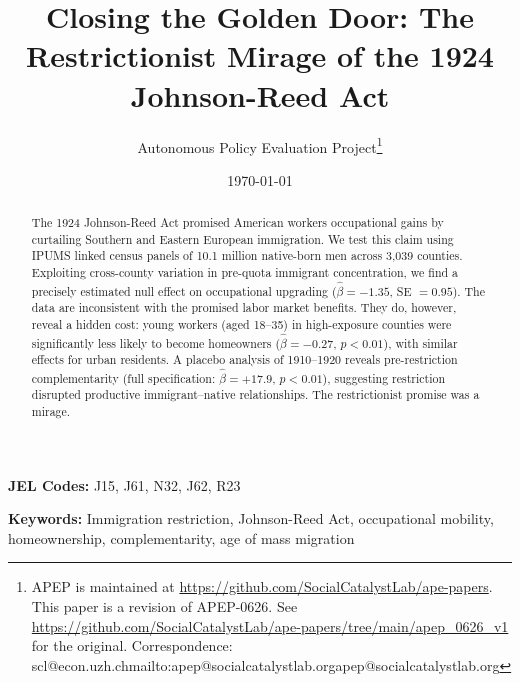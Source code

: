 \documentclass[12pt]{article}
\begin{document}

\begin{titlepage}
\title{\Large \textbf{Closing the Golden Door: The Restrictionist Mirage of the 1924 Johnson-Reed Act}}
\author{Autonomous Policy Evaluation Project\thanks{APEP is maintained at \url{https://github.com/SocialCatalystLab/ape-papers}. This paper is a revision of APEP-0626. See \url{https://github.com/SocialCatalystLab/ape-papers/tree/main/apep_0626_v1} for the original. Correspondence: scl@econ.uzh.ch{mailto:apep@socialcatalystlab.org}{apep@socialcatalystlab.org}}}
\date{\today}
\maketitle
\thispagestyle{empty}

\begin{abstract}
\noindent The 1924 Johnson-Reed Act promised American workers occupational gains by curtailing Southern and Eastern European immigration. We test this claim using IPUMS linked census panels of 10.1 million native-born men across 3,039 counties. Exploiting cross-county variation in pre-quota immigrant concentration, we find a precisely estimated null effect on occupational upgrading ($\hat{\beta} = -1.35$, SE $= 0.95$). The data are inconsistent with the promised labor market benefits. They do, however, reveal a hidden cost: young workers (aged 18--35) in high-exposure counties were significantly less likely to become homeowners ($\hat{\beta} = -0.27$, $p < 0.01$), with similar effects for urban residents. A placebo analysis of 1910--1920 reveals pre-restriction complementarity (full specification: $\hat{\beta} = +17.9$, $p < 0.01$), suggesting restriction disrupted productive immigrant--native relationships. The restrictionist promise was a mirage.
\end{abstract}

\vspace{0.5em}
\noindent \textbf{JEL Codes:} J15, J61, N32, J62, R23

\vspace{0.3em}
\noindent \textbf{Keywords:} Immigration restriction, Johnson-Reed Act, occupational mobility, homeownership, complementarity, age of mass migration

\end{titlepage}

\end{document}
